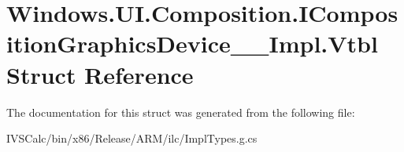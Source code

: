 \hypertarget{struct_windows_1_1_u_i_1_1_composition_1_1_i_composition_graphics_device_____impl_1_1_vtbl}{}\section{Windows.\+U\+I.\+Composition.\+I\+Composition\+Graphics\+Device\+\_\+\+\_\+\+Impl.\+Vtbl Struct Reference}
\label{struct_windows_1_1_u_i_1_1_composition_1_1_i_composition_graphics_device_____impl_1_1_vtbl}


The documentation for this struct was generated from the following file\+:\begin{DoxyCompactItemize}
\item 
I\+V\+S\+Calc/bin/x86/\+Release/\+A\+R\+M/ilc/Impl\+Types.\+g.\+cs\end{DoxyCompactItemize}
